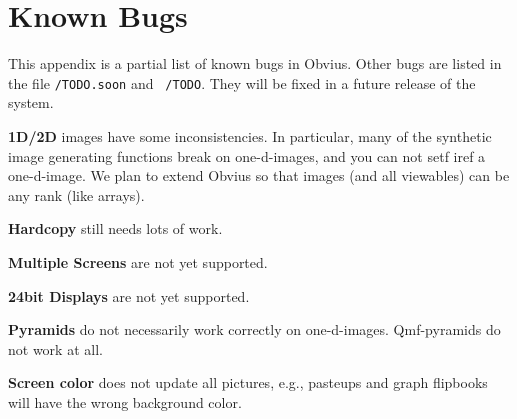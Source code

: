 \section{Known Bugs}

This appendix is a partial list of known bugs in Obvius.  Other bugs
are listed in the file {\tt {}/TODO.soon} and {\tt
{}/TODO}.  They will be fixed in a future release of the
system.

\begin{description}

\item {\bf 1D/2D} images have some inconsistencies.  In particular,
many of the synthetic image generating functions break on
one-d-images, and you can not setf iref a one-d-image.  We plan to
extend Obvius so that images (and all viewables) can be any rank (like
arrays).

\item {\bf Hardcopy} still needs lots of work.

\item {\bf Multiple Screens} are not yet supported.

\item {\bf 24bit Displays} are not yet supported.

\item {\bf Pyramids} do not necessarily work correctly on
one-d-images.  Qmf-pyramids do not work at all.

\item {\bf Screen color} does not update all pictures, e.g., pasteups
and graph flipbooks will have the wrong background color.

\end{description}
